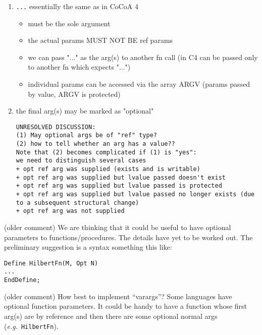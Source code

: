 \documentclass{book}[12,a4paper]
\def\eg{{\it e.g.}}
\begin{document}
\begin{enumerate}
\item \texttt{...} essentially the same as in CoCoA 4
  \begin{itemize}
  \item must be the sole argument
  \item the actual params MUST NOT BE ref params
  \item we can pass "..." as the arg(s) to another fn call
    (in C4 can be passed only to another fn which expects "...")
  \item individual params can be accessed via the array ARGV
    (params passed by value, ARGV is protected)
  \end{itemize}
\item  the final arg(s) may be marked as "optional"

\begin{verbatim}
UNRESOLVED DISCUSSION:
(1) May optional args be of "ref" type?
(2) how to tell whether an arg has a value??
Note that (2) becomes complicated if (1) is "yes":
we need to distinguish several cases
+ opt ref arg was supplied (exists and is writable)
+ opt ref arg was supplied but lvalue passed doesn't exist
+ opt ref arg was supplied but lvalue passed is protected
+ opt ref arg was supplied but lvalue passed no longer exists (due to a subsequent structural change)
+ opt ref arg was not supplied
\end{verbatim}

\end{enumerate}

\medskip
(older comment)
We are thinking that it could be useful to have optional parameters to
functions/procedures.  The details have yet to be worked out.  The
preliminary suggestion is a syntax something this like:
\begin{lstlisting}
Define HilbertFn(M, Opt N)
...
EndDefine;
\end{lstlisting}

\medskip
(older comment)
How best to implement ``varargs''?  Some languages have optional
  function parameters.  It could be handy to have a function whose first
  arg(s) are by reference and then there are some optional normal args
  (\eg~\texttt{HilbertFn}).
\end{document}
